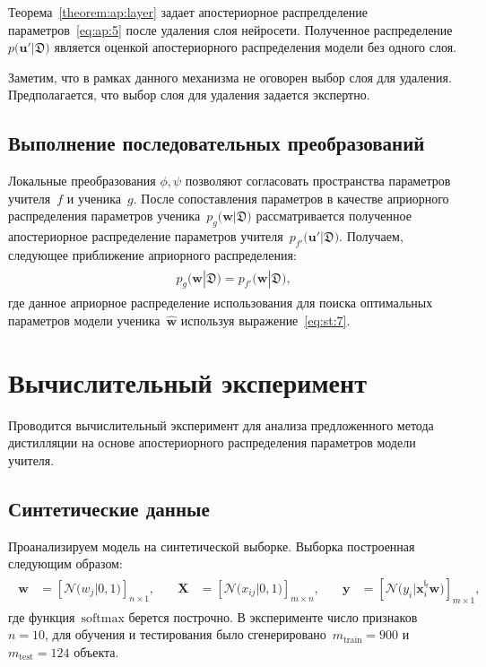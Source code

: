 \documentclass[12pt]{a&t}
\begin{document}
Теорема~\ref{theorem:ap:layer} задает апостериорное распрелделение параметров~\ref{eq:ap:5} после удаления слоя нейросети. Полученное распределение $p\bigr(\mathbf{u}'|\mathfrak{D}\bigr)$ является оценкой апостериорного распределения модели без одного слоя.

Заметим, что в рамках данного механизма не оговорен выбор слоя для удаления. Предполагается, что выбор слоя для удаления задается экспертно.

\subsection{Выполнение последовательных преобразований}
Локальные преобразования $\phi, \psi$ позволяют согласовать пространства параметров учителя~$f$ и ученика~$g$. После сопоставления параметров в качестве априорного распределения параметров ученика~$p_g\bigr(\mathbf{w}|\mathfrak{D}\bigr)$ рассматривается полученное апостериорное распределение параметров учителя~$p_{f'}\bigr(\mathbf{u}'|\mathfrak{D}\bigr)$. Получаем, следующее приближение априорного распределения:
\begin{gather}
\label{eq:ap:6}
\begin{aligned}
p_g\bigr(\mathbf{w}|\mathfrak{D}\bigr) = p_{f'}\bigr(\mathbf{w}|\mathfrak{D}\bigr),
\end{aligned}
\end{gather}
где данное априорное распределение использования для поиска оптимальных параметров модели ученика~$\hat{\mathbf{w}}$ используя выражение~\eqref{eq:st:7}.

\section{Вычислительный эксперимент}
Проводится вычислительный эксперимент для анализа предложенного метода дистилляции на основе апостериорного распределения параметров модели учителя.

\subsection{Синтетические данные}
Проанализируем модель на синтетической выборке. Выборка построенная следующим образом:
\begin{gather}
\label{eq:ex:1}
\begin{aligned}
\mathbf{w} &= \left[\mathcal{N}\bigr(w_{j}|0, 1\bigr)\right]_{n\times 1}, \quad &\mathbf{X} &= \left[\mathcal{N}\bigr(x_{ij}|0, 1\bigr)\right]_{m\times n}, \quad & \mathbf{y} &= \left[\mathcal{N}\bigr(y_i| \mathbf{x}_i^{\mathsf{{l_f}}}\mathbf{w}\bigr)\right]_{m \times 1},
\end{aligned}
\end{gather}
где функция~$\text{softmax}$ берется построчно. В эксперименте число признаков~$n=10$, для обучения и тестирования было сгенерировано~$m_{\text{train}}=900$ и~$m_{\text{test}}=124$ объекта.
\end{document}
